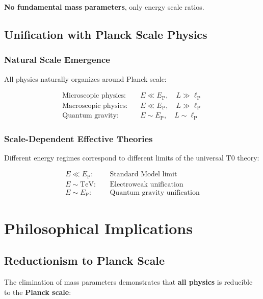 \documentclass[12pt,a4paper]{article}
\newcommand{\lP}{\ell_{\text{P}}}
\newcommand{\EP}{E_{\text{P}}}
\begin{document}
	\textbf{No fundamental mass parameters}, only energy scale ratios.
	
	\subsection{Unification with Planck Scale Physics}
	\label{subsec:planck_unification}
	
	\subsubsection{Natural Scale Emergence}
	
	All physics naturally organizes around Planck scale:
	
	\begin{align}
		\text{Microscopic physics:} \quad &E \ll \EP, \quad L \gg \lP \\
		\text{Macroscopic physics:} \quad &E \ll \EP, \quad L \gg \lP \\
		\text{Quantum gravity:} \quad &E \sim \EP, \quad L \sim \lP
	\end{align}
	
	\subsubsection{Scale-Dependent Effective Theories}
	
	Different energy regimes correspond to different limits of the universal T0 theory:
	
	\begin{align}
		E \ll \EP: \quad &\text{Standard Model limit} \\
		E \sim \text{TeV}: \quad &\text{Electroweak unification} \\
		E \sim \EP: \quad &\text{Quantum gravity unification}
	\end{align}
	
	\section{Philosophical Implications}
	\label{sec:philosophical}
	
	\subsection{Reductionism to Planck Scale}
	\label{subsec:reductionism}
	
	The elimination of mass parameters demonstrates that \textbf{all physics} is reducible to the \textbf{Planck scale}:
	
\end{document}
